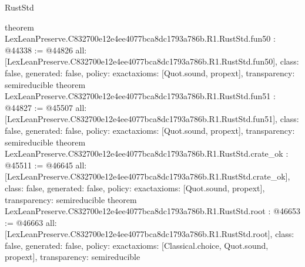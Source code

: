\begin{lexlean}{RustStd}
\begin{coremodule}
{}
theorem LexLeanPreserve.C832700e12e4ee4077bca8dc1793a786b.R1.RustStd.fun50 : @44338 := @44826 {
  all: [LexLeanPreserve.C832700e12e4ee4077bca8dc1793a786b.R1.RustStd.fun50],
  class: false,
  generated: false,
  policy: exact{axioms: [Quot.sound, propext]},
  transparency: semireducible
}
theorem LexLeanPreserve.C832700e12e4ee4077bca8dc1793a786b.R1.RustStd.fun51 : @44827 := @45507 {
  all: [LexLeanPreserve.C832700e12e4ee4077bca8dc1793a786b.R1.RustStd.fun51],
  class: false,
  generated: false,
  policy: exact{axioms: [Quot.sound, propext]},
  transparency: semireducible
}
theorem LexLeanPreserve.C832700e12e4ee4077bca8dc1793a786b.R1.RustStd.crate_ok : @45511 := @46645 {
  all: [LexLeanPreserve.C832700e12e4ee4077bca8dc1793a786b.R1.RustStd.crate_ok],
  class: false,
  generated: false,
  policy: exact{axioms: [Quot.sound, propext]},
  transparency: semireducible
}
theorem LexLeanPreserve.C832700e12e4ee4077bca8dc1793a786b.R1.RustStd.root : @46653 := @46663 {
  all: [LexLeanPreserve.C832700e12e4ee4077bca8dc1793a786b.R1.RustStd.root],
  class: false,
  generated: false,
  policy: exact{axioms: [Classical.choice, Quot.sound, propext]},
  transparency: semireducible
}


\end{coremodule}
\end{lexlean}
